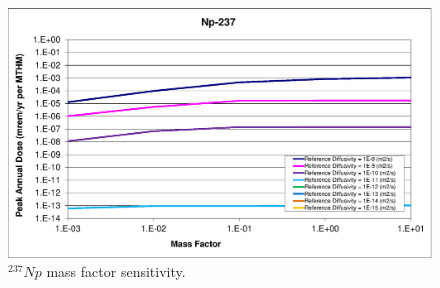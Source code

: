 \begin{figure}[ht!]
\begin{minipage}[b]{0.45\linewidth}
\includegraphics[width=\linewidth]{./chapters/nuclide_sensitivity/clay/DiffCoeffAndInvEBSFail/Np-237-MF.eps}
\caption{$^{237}Np$ mass factor sensitivity.}
\label{fig:DCInvNp237MF}

\end{minipage}
\end{figure}


\clearpage






